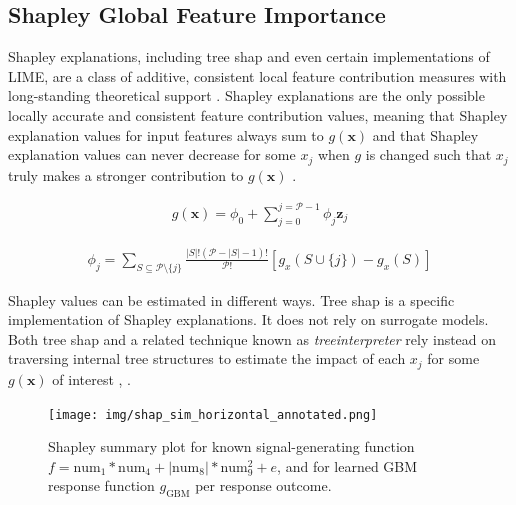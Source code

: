 \documentclass{article}
\begin{document}
\subsection{Shapley Global Feature Importance}

Shapley explanations, including tree shap and even certain implementations of LIME, are a class of additive, consistent local feature contribution measures with long-standing theoretical support \cite{shapley}. Shapley explanations are the only possible locally accurate and consistent feature contribution values, meaning that Shapley explanation values for input features always sum to $g(\mathbf{x})$ and that Shapley explanation values can never decrease for some $x_j$ when $g$ is changed such that $x_j$ truly makes a stronger contribution to $g(\mathbf{x})$ \cite{shapley}. 

\begin{equation}
\label{eq:shap_additive}
\begin{aligned}
g(\mathbf{x}) = \phi_0 + \sum_{j=0}^{j=\mathcal{P} - 1} \phi_j \mathbf{z}_j
\end{aligned}
\end{equation}

\begin{equation}
\label{eq:shap_contrib}
\begin{aligned}
\phi_{j} = \sum_{S \subseteq \mathcal{P} \setminus \{j\}}\frac{|S|!(\mathcal{P} -|S| -1)!}{\mathcal{P}!}[g_x(S \cup \{j\}) - g_x(S)]
\end{aligned}
\end{equation}

Shapley values can be estimated in different ways. Tree shap is a specific implementation of Shapley explanations. It does not rely on surrogate models. Both tree shap and a related technique known as \textit{treeinterpreter} rely instead on traversing internal tree structures to estimate the impact of each $x_j$ for some $g(\mathbf{x})$ of interest \cite{tree_shap}, \cite{treeinterpreter}.

\begin{figure}[!htbp]
	\begin{center}
		\texttt{[image: img/shap\_sim\_horizontal\_annotated.png]}
		\caption{Shapley summary plot for known signal-generating function $f = \text{num} _1 * \text{num}_4 + |\text{num}_8| * \text{num}_9^2 + e$, and for learned GBM response function $g_{\text{GBM}}$ per response outcome.}
		\label{fig:global_feature_imp}
	\end{center}
\end{figure}
\FloatBarrier
\end{document}
